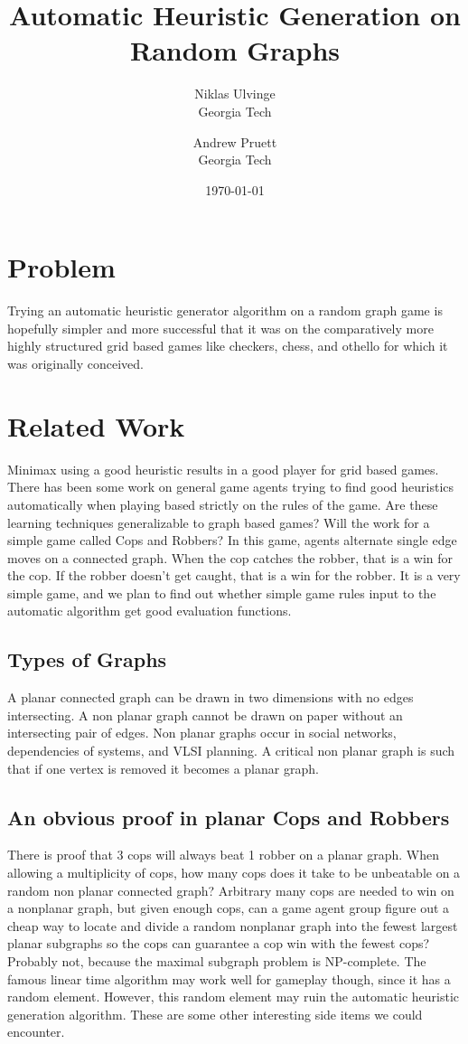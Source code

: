 \documentclass{article}
\title{Automatic Heuristic Generation on Random Graphs}
\author{Niklas Ulvinge  \\
	Georgia Tech  \\
	\and 
	Andrew Pruett \\
	Georgia Tech \\
	}
\date{\today}
\begin{document}
\maketitle

\section{Problem}
Trying an automatic heuristic generator algorithm on a random graph game is
hopefully simpler and more successful that it was on the comparatively 
more highly structured grid based games like checkers, chess, and othello for 
which it was originally conceived.

\section{Related Work}
Minimax using a good heuristic results in a good player for grid based 
games. There has been some work on general game agents trying
to find good heuristics automatically when playing based strictly on the
rules of the game. Are these learning techniques generalizable to graph 
based games? Will the work for a simple game called Cops and Robbers?
In this game, agents alternate single edge moves on a connected graph. When
the cop catches the robber, that is a win for the cop. If the robber doesn't
get caught, that is a win for the robber. It is a very simple game, and we plan to find out whether simple game rules
input to the automatic algorithm get good evaluation functions.

\subsection{Types of Graphs}
A planar connected graph can be drawn in two dimensions with no edges
intersecting. A non planar graph cannot be drawn on paper without an 
intersecting pair of edges. Non planar graphs occur in social networks,
dependencies of systems, and VLSI planning. A critical non planar graph is
such that if one vertex is removed it becomes a planar graph.

\subsection{An obvious proof in planar Cops and Robbers}
There is proof that 3 cops will always beat 1 robber on a planar graph. When
allowing a multiplicity of cops, how many cops does it take to be unbeatable
on a random non planar connected graph? Arbitrary many cops are needed to 
win on a nonplanar graph, but given enough cops, can a game agent group figure out a 
cheap way to locate and divide a random nonplanar graph into the fewest 
largest planar subgraphs so the cops can guarantee a cop win with the fewest
cops? Probably not, because the maximal subgraph problem is NP-complete. The
famous linear time algorithm may work well for gameplay though, since it has
a random element. However, this random element may ruin the automatic heuristic
generation algorithm. These are some other interesting side items we could
encounter.
\end{document}
